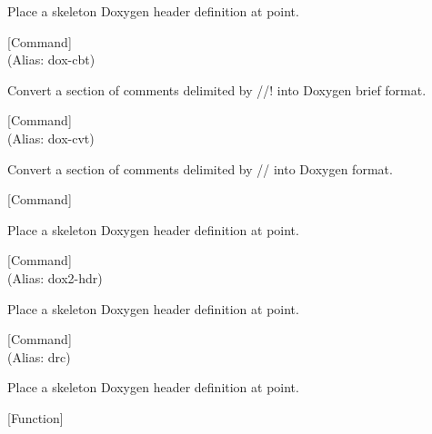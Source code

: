 \begin{doc-string}
Place a skeleton Doxygen header definition at point.
\end{doc-string}

\vspace{1em}
\noindent
{}
\usebox{\funcname}
 \hfill [Command]\\%
 (Alias: dox-cbt)

\begin{doc-string}
Convert a section of comments delimited by //! into Doxygen brief format.
\end{doc-string}

\vspace{1em}
\noindent
{}
\usebox{\funcname}
 \hfill [Command]\\%
 (Alias: dox-cvt)

\begin{doc-string}
Convert a section of comments delimited by // into Doxygen format.
\end{doc-string}

\vspace{1em}
\noindent
{}
\usebox{\funcname}
 \hfill [Command]

\begin{doc-string}
Place a skeleton Doxygen header definition at point.
\end{doc-string}

\vspace{1em}
\noindent
{}
\usebox{\funcname}
 \hfill [Command]\\%
 (Alias: dox2-hdr)

\begin{doc-string}
Place a skeleton Doxygen header definition at point.
\end{doc-string}

\vspace{1em}
\noindent
{}
\usebox{\funcname}
 \hfill [Command]\\%
 (Alias: drc)

\begin{doc-string}
Place a skeleton Doxygen header definition at point.
\end{doc-string}

\vspace{1em}
\noindent
{}
\usebox{\funcname}
 \hfill [Function]

